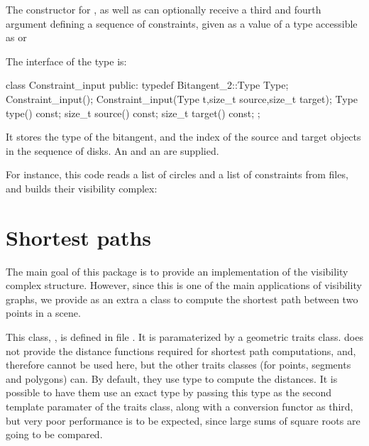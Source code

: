 The constructor for , as well as
 can optionally
receive a third and fourth argument defining a sequence of
constraints, given as a value of a type accessible as
 or 

The interface of the  type is:
\begin{ccExampleCode}
class Constraint_input {
public:
  typedef Bitangent_2::Type Type;
  Constraint_input();
  Constraint_input(Type t,size_t source,size_t target);
  Type type() const;
  size_t source() const;
  size_t target() const;
};
\end{ccExampleCode}
It stores the type of the bitangent, and the index of the source and target
objects in the sequence of disks. An  and an  are supplied.

For instance, this code reads a list of circles and a list of constraints
from files, and builds their visibility complex:

\section{Shortest paths}

The main goal of this package is to provide an implementation of the
visibility complex structure. However, since this is one of the main
applications of visibility graphs, we provide as an extra a class to
compute the shortest path between two points in a scene. 

This class, , is defined in file
. It is paramaterized by a geometric traits
class.  does not provide the
distance functions required for shortest path computations, and, therefore
cannot be used here, but the other traits classes (for points, segments and
polygons) can. By default, they use type  to compute the
distances. It is possible to have them use an exact type by passing this
type as the second template paramater of the traits class, along with a
conversion functor as third, but very poor performance is to be expected,
since large sums of square roots are going to be compared.

